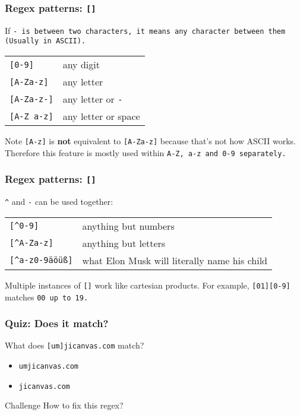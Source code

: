 \begin{frame}[fragile]
\frametitle{Regex patterns: \tt{[]}}
If \tt{-} is between two characters, it means any character between them
(Usually in ASCII). 
\begin{table}
    \centering
    \begin{tabular}{ll}
        \verb|[0-9]|        & any digit \\
        \verb|[A-Za-z]|     & any letter \\
        \verb|[A-Za-z-]|    & any letter or \tt{-} \\
        \verb|[A-Z a-z]|    & any letter or space \\
    \end{tabular}
\end{table}
\begin{block}{Note}
    \verb|[A-z]| is \textbf{not} equivalent to \verb|[A-Za-z]| because that's
    not how ASCII works. Therefore this feature is mostly used within \tt{A-Z},
    \tt{a-z} and \tt{0-9} separately.
\end{block}
\end{frame}

\begin{frame}[fragile]
\frametitle{Regex patterns: \tt{[]}}
\verb|^| and \verb|-| can be used together:
\begin{table}
    \centering
    \begin{tabular}{ll}
        \verb|[^0-9]|           & anything but numbers \\
        \verb|[^A-Za-z]|        & anything but letters \\
        \verb|[^a-z0-9äöüß]|    & what Elon Musk will literally name his child \\
    \end{tabular}
\end{table}
Multiple instances of \verb|[]| work like cartesian products.
For example, \verb|[01][0-9]| matches \tt{00} up to \tt{19}.
\end{frame}

\begin{frame}[fragile]
\frametitle{Quiz: Does it match?}
What does \Large \verb|[um]jicanvas.com| \normalsize match?
\begin{itemize}
    \item \tt{umjicanvas.com}
    \item \tt{jicanvas.com} %
\end{itemize}
\pause
\begin{block}{Challenge}
    How to fix this regex? %
\end{block}
\end{frame}

